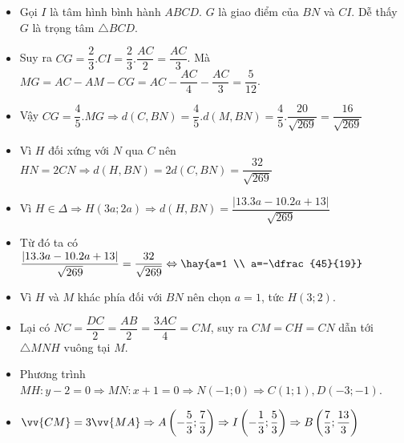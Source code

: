 \begin{itemize}[label=,leftmargin=*]
\item Gọi $I$ là tâm hình bình hành $ABCD$. $G$ là giao điểm của $BN$ và $CI$. Dễ thấy $G$ là trọng tâm $\triangle BCD$.
\item Suy ra $CG=\dfrac{2}{3}.CI=\dfrac{2}{3}.\dfrac{AC}{2}=\dfrac{AC}{3}$. Mà $MG=AC-AM-CG=AC-\dfrac{AC}{4}-\dfrac{AC}{3}=\dfrac{5}{12}$. 
\item Vậy $CG=\dfrac{4}{5}.MG\Rightarrow d(C,BN)=\dfrac{4}{5}.d(M,BN)=\dfrac{4}{5}.\dfrac{20}{\sqrt{269}}=\dfrac{16}{\sqrt{269}}$
\item Vì $H$ đối xứng với $N$ qua $C$ nên $HN=2CN\Rightarrow d(H,BN)=2d(C,BN)=\dfrac{32}{\sqrt{269}}$
\item Vì $H\in \Delta \Rightarrow H(3a;2a)\Rightarrow d(H,BN)=\dfrac{|13.3a-10.2a+13|}{\sqrt{269}}$
\item Từ đó ta có $\dfrac{|13.3a-10.2a+13|}{\sqrt{269}}=\dfrac{32}{\sqrt{269}}\Leftrightarrow \hay{a=1 \\ a=-\dfrac{45}{19}}$
\item Vì $H$ và $M$ khác phía đối với $BN$ nên chọn $a=1$, tức $H(3;2)$.
\item Lại có $NC=\dfrac{DC}{2}=\dfrac{AB}{2}=\dfrac{3AC}{4}=CM$, suy ra $CM=CH=CN$ dẫn tới $\triangle MNH$ vuông tại $M$.
\item Phương trình $MH:y-2=0\Rightarrow MN:x+1=0\Rightarrow N(-1;0)\Rightarrow C(1;1),D(-3;-1)$.
\item $\vv{CM}=3\vv{MA}	\Rightarrow A\left(-\dfrac{5}{3};\dfrac{7}{3} \right)\Rightarrow I\left(-\dfrac{1}{3};\dfrac{5}{3} \right)\Rightarrow B\left(\dfrac{7}{3};\dfrac{13}{3} \right)$
\end{itemize}


